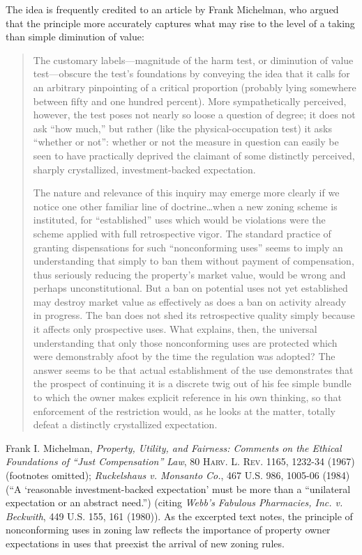 The idea is frequently credited to an article by Frank Michelman, who argued
that the principle more accurately captures what may rise to the level of a
taking than simple diminution of value:
\begin{quotation}
The customary labels---magnitude of the harm test, or diminution of value
test---obscure the test's foundations by conveying the idea that it calls for an
arbitrary pinpointing of a critical proportion (probably lying somewhere between
fifty and one hundred percent). More sympathetically perceived, however, the
test poses not nearly so loose a question of degree; it does not ask ``how
much,'' but rather (like the physical-occupation test) it asks ``whether or
not'': whether or not the measure in question can easily be seen to have
practically deprived the claimant of some distinctly perceived, sharply
crystallized, investment-backed expectation.

The nature and relevance of this inquiry may emerge more clearly if we notice
one other familiar line of doctrine\ldots when a new zoning scheme is
instituted, for ``established'' uses which would be violations were the scheme
applied with full retrospective vigor. The standard practice of granting
dispensations for such ``nonconforming uses'' seems to imply an understanding
that simply to ban them without payment of compensation, thus seriously reducing
the property's market value, would be wrong and perhaps unconstitutional. But a
ban on potential uses not yet established may destroy market value as
effectively as does a ban on activity already in progress. The ban does not shed
its retrospective quality simply because it affects only prospective uses. What
explains, then, the universal understanding that only those nonconforming uses
are protected which were demonstrably afoot by the time the regulation was
adopted? The answer seems to be that actual establishment of the use
demonstrates that the prospect of continuing it is a discrete twig out of his
fee simple bundle to which the owner makes explicit reference in his own
thinking, so that enforcement of the restriction would, as he looks at the
matter, totally defeat a distinctly crystallized expectation.
\end{quotation}
Frank I. Michelman, \textit{Property, Utility, and Fairness: Comments on the
Ethical Foundations of ``Just Compensation'' Law}, 80 \textsc{Harv. L. Rev}.
1165, 1232-34 (1967) (footnotes omitted); \emph{Ruckelshaus v. Monsanto Co.},
467 U.S. 986, 1005-06 (1984) (``A `reasonable investment-backed expectation'
must be more than a ``unilateral expectation or an abstract need.'') (citing
\textit{Webb's Fabulous Pharmacies, Inc. v. Beckwith}, 449 U.S. 155, 161
(1980)). As the excerpted text notes, the principle of nonconforming uses in
zoning law reflects the importance of property owner expectations in uses that
preexist the arrival of new zoning rules.

